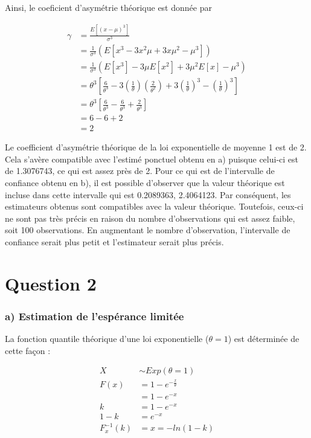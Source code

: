 \documentclass[]{article}
\begin{document}
Ainsi, le coeficient d'asymétrie théorique est donnée par

\begin{align*}
    \gamma 
    &= \frac{E\left[ (x - \mu)^3 \right]}{\sigma^3} \\
    &= \frac{1}{\sigma^3} \left( E[x^3 - 3x^2\mu + 3x\mu^2 - \mu^3] \right) \\
    &= \frac{1}{\sigma^3} \left( E[x^3] - 3\mu E[x^2] + 3\mu^2E[x] - \mu^3  \right) \\
    &= \theta^3 \left[ \frac{6}{\theta^3} - 3 \left(\frac{1}{\theta}\right) \left(\frac{2}{\theta^2}\right) + 3 \left(\frac{1}{\theta}\right)^3 - \left(\frac{1}{\theta}\right)^3 \right] \\
    &= \theta^3 \left[ \frac{6}{\theta^3} - \frac{6}{\theta^3} + \frac{2}{\theta^3} \right] \\
    &= 6 - 6 + 2 \\
    &= 2
\end{align*}

Le coefficient d'asymétrie théorique de la loi exponentielle de moyenne
1 est de 2. Cela s'avère compatible avec l'estimé ponctuel obtenu en a)
puisque celui-ci est de 1.3076743, ce qui est assez près de 2. Pour ce
qui est de l'intervalle de confiance obtenu en b), il est possible
d'observer que la valeur théorique est incluse dans cette intervalle qui
est 0.2089363, 2.4064123. Par conséquent, les estimateurs obtenus sont
compatibles avec la valeur théorique. Toutefois, ceux-ci ne sont pas
très précis en raison du nombre d'observations qui est assez faible,
soit 100 observations. En augmentant le nombre d'observation,
l'intervalle de confiance serait plus petit et l'estimateur serait plus
précis.

\newpage

\section{Question 2}\label{question-2}

\subsubsection{a) Estimation de l'espérance
limitée}\label{a-estimation-de-lesperance-limitee}

La fonction quantile théorique d'une loi exponentielle (\(\theta =1\))
est déterminée de cette façon :

\begin{align*}
    X 
    &\sim Exp(\theta = 1) \\
    F(x) 
    &= 1 - e^{-\frac{x}{\theta}} \\
    &= 1 - e^{-x} \\
    k 
    &= 1 - e^{-x} \\
    1 - k 
    &= e^{-x} \\
    F_x^{-1}(k) 
    &= x = -ln(1-k) \\
\end{align*}
\end{document}
